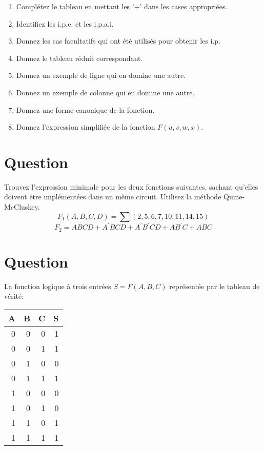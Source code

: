 \documentclass[letter, oneside]{book}
\begin{document}
\begin{enumerate}
\item Complétez le tableau en mettant les '+' dans les cases
appropriées.

\item Identifiez les i.p.e. et les i.p.a.i.

\item Donnez les cas facultatifs qui ont été utilisés pour obtenir les
i.p.

\item Donnez le tableau réduit correspondant.

\item Donnez un exemple de ligne qui en domine une autre.

\item Donnez un exemple de colonne qui en domine une autre.

\item Donnez une forme canonique de la fonction.

\item Donnez l'expression simplifiée de la fonction \(F(u,v,w,x)\).
\end{enumerate}

\section*{Question}
\label{sec:org2824dcb}
Trouvez l'expression minimale pour les deux fonctions suivantes,
   sachant qu'elles doivent être implémentées dans un même
   circuit. Utilisez la méthode Quine-McCluskey.
   $$
     F_1(A, B, C, D)
     =\sum(2,5,6,7,10,11,14,15)
     $$
   $$
     F_2 = A B C D + A^\prime B C D +
     A^\prime B^\prime C D + A B^\prime C + ABC
     $$

\section*{Question}
\label{sec:orgfdb91fb}
La fonction logique à trois entrées \(S = F(A,B,C)\) représentée par le
  tableau de vérité:

\begin{center}
\begin{tabular}{rrrr}
A & B & C & S\\[0pt]
\hline
0 & 0 & 0 & 1\\[0pt]
0 & 0 & 1 & 1\\[0pt]
0 & 1 & 0 & 0\\[0pt]
0 & 1 & 1 & 1\\[0pt]
1 & 0 & 0 & 0\\[0pt]
1 & 0 & 1 & 0\\[0pt]
1 & 1 & 0 & 1\\[0pt]
1 & 1 & 1 & 1\\[0pt]
\end{tabular}
\end{center}
\end{document}
